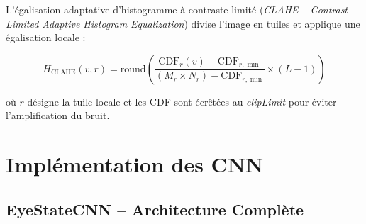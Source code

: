 L'égalisation adaptative d'histogramme à contraste limité (\textit{CLAHE -- Contrast Limited Adaptive Histogram Equalization}) divise l'image en tuiles et applique une égalisation locale :

\begin{equation}
H_{\text{CLAHE}}(v, r) = \text{round}\left(\frac{\text{CDF}_r(v) - \text{CDF}_{r,\min}}{(M_r \times N_r) - \text{CDF}_{r,\min}} \times (L - 1)\right)
\label{eq:clahe}
\end{equation}

où $r$ désigne la tuile locale et les CDF sont écrêtées au \textit{clipLimit} pour éviter l'amplification du bruit.

\section{Implémentation des CNN}

\subsection{EyeStateCNN -- Architecture Complète}

